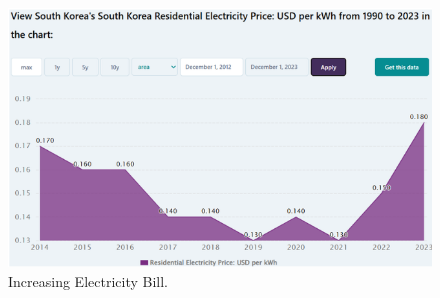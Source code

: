 \documentclass[11pt,twocolumn]{article}
\begin{document}
            \begin{figure}[h]
                \centering
                \includegraphics[width=0.8\columnwidth]{bill.png}
                \caption{Increasing Electricity Bill.}
                \label{bill}
            \end{figure}
            
    \printbibliography
\end{document}
